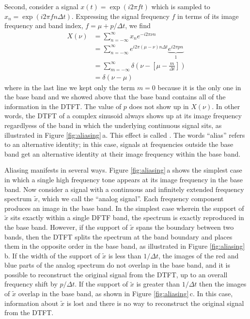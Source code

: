 Second, consider a signal $x(t) = \exp(i 2 \pi f t)$ which is sampled to $x_n = \exp( i 2 \pi f n \Delta t)$.
Expressing the signal frequency $f$ in terms of its image frequency and band index, $f= \mu + p/\Delta t$, we find
\begin{align}
X(\nu)
  &= \sum_{n=-\infty}^\infty x_n e^{-i 2 \pi \nu n} \nonumber \\
  &= \sum_{n=-\infty}^\infty e^{i 2 \pi (\mu - \nu) n \Delta t} \underbrace{e^{i 2 \pi p n}}_1 \nonumber \\
  &= \sum_{m=-\infty}^\infty \delta \left(\nu - \left[ \mu - \frac{m}{\Delta t} \right] \right) \nonumber \\
  &= \delta(\nu - \mu)
\end{align}
where in the last line we kept only the term $m=0$ because it is the only one in the base band and we showed above that the base band contains all of the information in the DTFT.
The value of $p$ does not show up in $X(\nu)$.
In other words, the DTFT of a complex sinusoid always shows up at its image frequency regardlyess of the band in which the underlying continuous signal sits, as illustrated in Figure \ref{fig:aliasing}\,a.
This effect is called .
The words ``alias'' refers to an alternative identity; in this case, signals at frequencies outside the base band get an alternative identity at their image frequency within the base band.

Aliasing manifests in several ways.
Figure \ref{fig:aliasing}\,a shows the simplest case in which a single high frequency tone appears at its image frequency in the base band.
Now consider a signal with a continuous and infinitely extended frequency spectrum $\tilde{x}$, which we call the ``analog signal''.
Each frequency component produces an image in the base band.
In the simplest case wherein the support of $\tilde{x}$ sits exactly within a single DFTF band, the spectrum is exactly reproduced in the base band.
However, if the support of $\tilde{x}$ spans the boundary between two bands, then the DTFT splits the spectrum at the band boundary and places them in the opposite order in the base band, as illustrated in Figure \ref{fig:aliasing}\,b.
If the width of the support of $\tilde{x}$ is less than $1/\Delta t$, the images of the red and blue parts of the analog spectrum do not overlap in the base band, and it is possible to reconstruct the original signal from the DTFT, up to an overall frequency shift by $p/\Delta t$.
If the support of $\tilde{x}$ is greater than $1/\Delta t$ then the images of $\tilde{x}$ overlap in the base band, as shown in Figure \ref{fig:aliasing}\,c.
In this case, information about $\tilde{x}$ is lost and there is no way to reconstruct the original signal from the DTFT.

